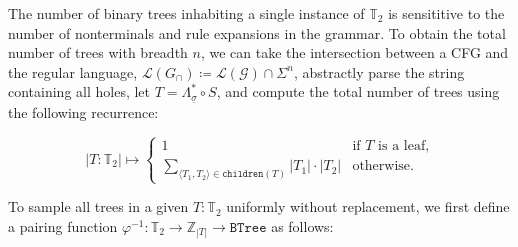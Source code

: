 \documentclass[sigplan,review,anonymous,acmsmall]{acmart}\settopmatter{printfolios=false,printccs=false,printacmref=false}
\begin{document}
  The number of binary trees inhabiting a single instance of $\mathbb{T}_2$ is sensititive to the number of nonterminals and rule expansions in the grammar. To obtain the total number of trees with breadth $n$, we can take the intersection between a CFG and the regular language, $\mathcal{L}(G_\cap) \coloneqq \mathcal{L}(\mathcal{G}) \cap \Sigma^n$, abstractly parse the string containing all holes, let $T=\Lambda_{\underline\sigma}^* \circ S$, and compute the total number of trees using the following recurrence:



  \begin{equation}
    |T: \mathbb{T}_2| \mapsto \begin{cases}
                                1  & \text{if $T$ is a leaf,} \\
                                \sum_{\langle T_1, T_2\rangle \in \texttt{children}(T)} |T_1| \cdot |T_2| & \text{otherwise.}
    \end{cases}
  \end{equation}

  To sample all trees in a given $T: \mathbb{T}_2$ uniformly without replacement, we first define a pairing function $\varphi^{-1}: \mathbb{T}_2 \rightarrow \mathbb{Z}_{|T|} \rightarrow \texttt{BTree}$ as follows:

\end{document}
